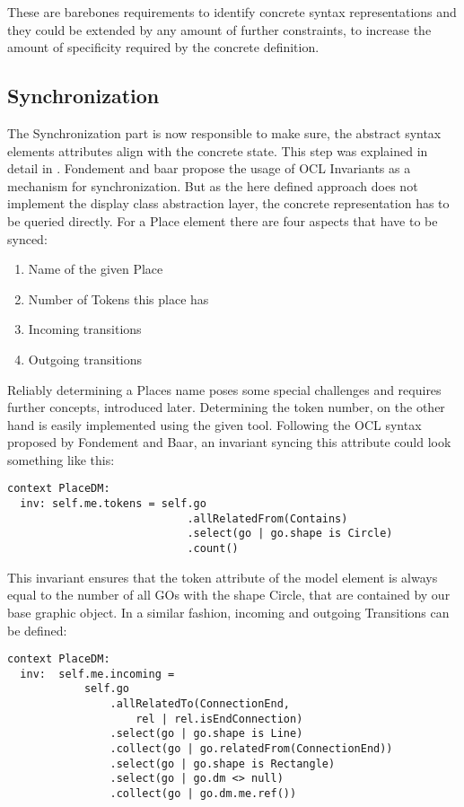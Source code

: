 These are barebones requirements to identify concrete syntax representations and they could be extended by any amount of further constraints, to increase the amount of specificity required by the concrete definition.

\subsection{Synchronization}
The Synchronization part is now responsible to make sure, the abstract syntax elements attributes align with the concrete state. This step was explained in detail in \cite{fondement_making_2005}. Fondement and baar propose the usage of OCL Invariants as a mechanism for synchronization. But as the here defined approach does not implement the display class abstraction layer, the concrete representation has to be queried directly. For a Place element there are four aspects that have to be synced:
\begin{enumerate}
  \item Name of the given Place
  \item Number of Tokens this place has
  \item Incoming transitions
  \item Outgoing transitions
\end{enumerate} 

Reliably determining a Places name poses some special challenges and requires further concepts, introduced later. Determining the token number, on the other hand is easily implemented using the given tool. Following the OCL syntax proposed by Fondement and Baar, an invariant syncing this attribute could look something like this:
\begin{lstlisting}[language=OCL]
  context PlaceDM: 
  inv: self.me.tokens = self.go
                            .allRelatedFrom(Contains)
                            .select(go | go.shape is Circle)
                            .count()
\end{lstlisting}

This invariant ensures that the token attribute of the model element is always equal to the number of all GOs with the shape Circle, that are contained by our base graphic object. In a similar fashion, incoming and outgoing Transitions can be defined:
\begin{lstlisting}[language=OCL]
  context PlaceDM: 
  inv:  self.me.incoming = 
            self.go
                .allRelatedTo(ConnectionEnd, 
                    rel | rel.isEndConnection)
                .select(go | go.shape is Line)
                .collect(go | go.relatedFrom(ConnectionEnd))
                .select(go | go.shape is Rectangle)
                .select(go | go.dm <> null)
                .collect(go | go.dm.me.ref())
\end{lstlisting}

